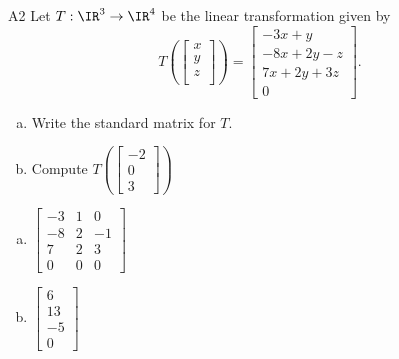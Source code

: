 \begin{problem}{A2}
Let $T: \IR^3\rightarrow \IR^4$ be the linear transformation given by $$T\left(\begin{bmatrix} x \\ y \\ z \\  \end{bmatrix} \right) = \begin{bmatrix} -3x+y \\ -8x+2y-z \\ 7x+2y+3z \\ 0 \end{bmatrix}.$$
\begin{enumerate}[(a)]
\item Write the standard matrix for $T$.
\item Compute \( T\left( \begin{bmatrix}-2 \\ 0 \\ 3 \end{bmatrix} \right) \)
\end{enumerate}
\end{problem}
\begin{solution}
\begin{enumerate}[(a)]
\item \(\begin{bmatrix} -3 & 1 & 0 \\ -8 & 2 & -1 \\ 7 & 2 & 3 \\ 0 & 0 & 0  \end{bmatrix}\)
\item \(\begin{bmatrix} 6 \\ 13 \\ -5 \\ 0 \end{bmatrix}\)
\end{enumerate}
\end{solution}



